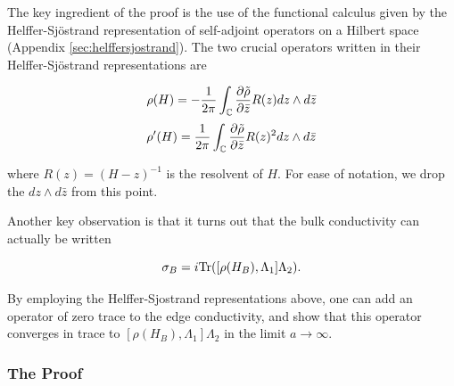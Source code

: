 \documentclass[12pt, letterpaper]{article}
\begin{document}
The key ingredient of the proof is the use of the functional calculus given by the Helffer-Sj\"{o}strand representation of self-adjoint operators on a Hilbert space (Appendix \ref{sec:helffersjostrand}). The two crucial operators written in their Helffer-Sj\"{o}strand representations are

\[\rho(H) = -\frac{1}{2\pi} \int_{\mathbb{C}} \frac{\partial\tilde{\rho}}{\partial\bar{z}} R(z)dz\wedge d\bar{z}\]
\[\rho'(H) = \frac{1}{2\pi} \int_{\mathbb{C}} \frac{\partial\tilde{\rho}}{\partial\bar{z}} R(z)^2dz\wedge d\bar{z}\]

where $R(z) = (H-z)^{-1}$ is the resolvent of $H$. For ease of notation, we drop the $dz\wedge d\bar{z}$ from this point. 

Another key observation is that it turns out that the bulk conductivity can actually be written

\[\sigma_B = i\text{Tr}([\rho(H_B),\Lambda_1]\Lambda_2).\]

By employing the Helffer-Sjostrand representations above, one can add an operator of zero trace to the edge conductivity, and show that this operator converges in trace to $[\rho(H_B),\Lambda_1]\Lambda_2$ in the limit $a\to\infty$.

\subsubsection*{The Proof}
\end{document}
